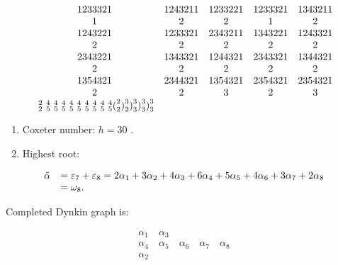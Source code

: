 \[
\begin{array}{c c c c c} 1   2   3   3   3   2   1 & 1   2   4   3   2   1   1 & 1   2   3   3   2   2   1 & 1   2   3   3   3   2   1 & 1   3   4   3   2   1   1 \\ 1 & 2 & 2 & 1 & 2 \\ 1   2   4   3   2   2   1 & 1   2   3   3   3   2   1 & 2   3   4   3   2   1   1 & 1   3   4   3   2   2   1 & 1   2   4   3   3   2   1 \\ 2 & 2 & 2 & 2 & 2 \\ 2   3   4   3   2   2   1 & 1   3   4   3   3   2   1 & 1   2   4   4   3   2   1 & 2   3   4   3   3   2   1 & 1   3   4   4   3   2   1 \\ 2 & 2 & 2 & 2 & 2 \\ 1   3   5   4   3   2   1 & 2   3   4   4   3   2   1 & 1   3   5   4   3   2   1 & 2   3   5   4   3   2   1 & 2   3   5   4   3   2   1 \\ 2 & 2 & 3 & 2 & 3 \\ \text { } _ {2} ^ {2} \text { } _ {5} ^ {4} \text { } _ {5} ^ {4} \text { } _ {5} ^ {4} \text { } _ {5} ^ {4} \text { } _ {5} ^ {4} \text { } _ {5} ^ {4} \text { } _ {5} ^ {4} \text { } _ {5} ^ {4} \text { } _ {5} ^ {4} \text {(} _ {2} ^ {2} \text {)} _ {2} ^ {3} \text {)} _ {3} ^ {3} \text {)} _ {3} ^ {3} \text {)} _ {3} ^ {3} \end{array}
\]

\begin{enumerate}
\def\labelenumi{(\Roman{enumi})}
\setcounter{enumi}{2}
\item
  Coxeter number: \(h = 30\) .
\item
  Highest root:
\end{enumerate}

\[
\begin{array}{r l} \tilde {\alpha} & = \varepsilon_ {7} + \varepsilon_ {8} = 2 \alpha_ {1} + 3 \alpha_ {2} + 4 \alpha_ {3} + 6 \alpha_ {4} + 5 \alpha_ {5} + 4 \alpha_ {6} + 3 \alpha_ {7} + 2 \alpha_ {8} \\ & = \omega_ {8}. \end{array}
\]

Completed Dynkin graph is:

\[
\begin{array}{c} \alpha_ {1} \quad \alpha_ {3} \\ \alpha_ {4} \quad \alpha_ {5} \quad \alpha_ {6} \quad \alpha_ {7} \quad \alpha_ {8} \\ \alpha_ {2} \end{array}
\]

